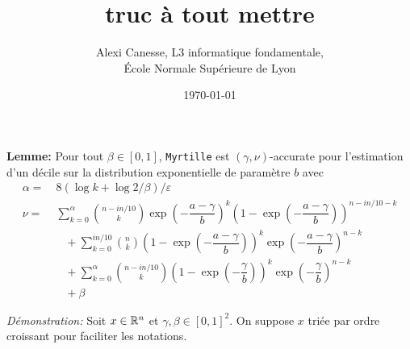 
\usepackage{tkz-base}
\usepackage{algorithm}
\usepackage{algorithmic}
\setlength\parindent{0pt}





\title{truc à tout mettre}           
\author{Alexi Canesse, L3 informatique fondamentale,\\École Normale Supérieure de Lyon}
\date{\today}          

\sloppy                  

\pgfplotsset{compat=1.16}







\textbf{Lemme: } Pour tout \(\beta \in [0,1]\), \texttt{Myrtille} est \((\gamma, \nu)\)-accurate pour l'estimation d'un décile sur la distribution exponentielle de paramètre \(b\) avec
\begin{align*}
    \alpha =&\ 8\left( \log k + \log 2/\beta \right)/\varepsilon\\
    \nu = &\ \sum_{k = 0}^{\alpha} \binom{n - in/10}{k}\exp\left( -\dfrac{a-\gamma}{b} \right)^k \left( 1 - \exp\left( -\dfrac{a-\gamma}{b} \right) \right)^{n - in/10 -k} \\
    & \quad  + \sum_{k = 0}^{in/10} \binom{n}{k} \left( 1 - \exp\left( -\dfrac{a-\gamma}{b} \right) \right)^k \exp\left( -\dfrac{a-\gamma}{b} \right)^{n-k} \\
    & \quad + \sum_{k = 0}^{\alpha} \binom{n - in/10}{k} \left( 1 - \exp\left( -\dfrac{\gamma}{b} \right) \right)^k \exp\left( -\dfrac{\gamma}{b} \right)^{n-k}\\
    & \quad + \beta
\end{align*}

\textit{Démonstration:} Soit \(x \in \mathbb{R}^n\) et \(\gamma, \beta \in [0,1]^2\). On suppose \(x\) triée par ordre croissant pour faciliter les notations.\\

